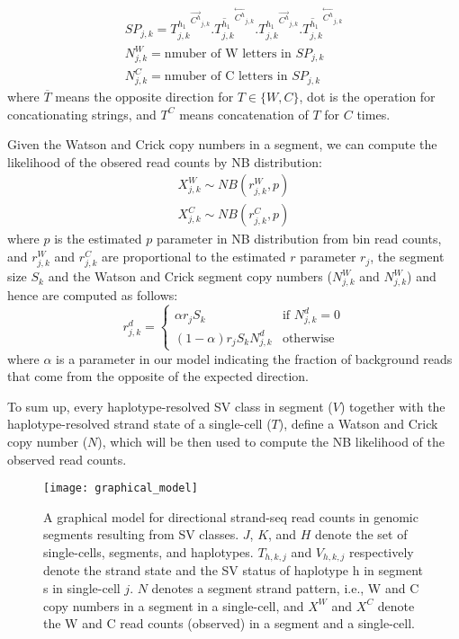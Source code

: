 \documentclass[12pt]{article}
\renewcommand{\j}{j} %
\newcommand{\CN}{C} %
\newcommand{\X}{X} %
\renewcommand{\k}{k} %
\newcommand{\h}{h} %
\newcommand{\T}{T} %
\newcommand{\V}{V} %
\newcommand{\N}{N} %
\begin{document}
\begin{align}
	SP_{\j,\k} = {\T_{\j, \k}^{\h_1}}^{\stackrel{\rightarrow}{\CN^{\h}}_{\j,\k}}.
				  {\overline{\T_{\j, \k}^{\h_1}}}^{\stackrel{\leftarrow}{\CN^{\h}}_{\j,\k}}.
				  {\T_{\j, \k}^{\h_1}}^{\stackrel{\rightarrow}{\CN^{\h}}_{\j,\k}}.
				  {\overline{\T_{\j, \k}^{\h_1}}}^{\stackrel{\leftarrow}{\CN^{\h}}_{\j,\k}}\nonumber\\
	\N_{\j, \k}^W = \text{nmuber of W letters in } SP_{\j,\k}\nonumber\\
	\N_{\j, \k}^C = \text{nmuber of C letters in } SP_{\j,\k}\nonumber
\end{align}
where $\overline{\T}$ means the opposite direction for $\T \in \{W, C\}$, dot is the operation for concationating strings, and $\T^C$ means concatenation of $\T$ for $C$ times.

Given the Watson and Crick copy numbers in a segment, we can compute the likelihood of the obsered read counts by NB distribution:
\begin{align}
	\X_{\j,\k}^W \sim NB(r_{\j,\k}^W, p)\nonumber\\
	\X_{\j,\k}^C \sim NB(r_{\j,\k}^C, p)\nonumber
\end{align}
where $p$ is the estimated $p$ parameter in NB distribution from bin read counts, and $r_{\j,\k}^W$ and $r_{\j,\k}^C$ are proportional to the estimated $r$ parameter $r_\j$, the segment size $S_\k$ and the Watson and Crick segment copy numbers ($\N_{\j, \k}^W$ and $\N_{\j, \k}^W$) and hence are computed as follows:
\[
r_{\j,\k}^d = 
\begin{cases}
\alpha r_\j S_\k &\text{if } \N_{\j, \k}^d = 0 \\ 
(1- \alpha) r_\j S_\k \N_{\j, \k}^d &\text{otherwise}
\end{cases}
\]
where $\alpha$ is a parameter in our model indicating the fraction of background reads that come from the opposite of the expected direction.

To sum up, every haplotype-resolved SV class in segment ($\V$) together with the haplotype-resolved strand state of a single-cell ($\T$), define a Watson and Crick copy number ($\N$), which will be then used to compute the NB likelihood of the observed read counts.


\begin{figure}
	\begin{center}
		\texttt{[image: graphical\_model]}
	\end{center}
\caption{A graphical model for directional strand-seq read counts in genomic segments resulting from SV classes. $J$, $K$, and $H$ denote the set of single-cells, segments, and haplotypes. $\T_{\h,\k,\j}$ and $\V_{\h,\k,\j}$ respectively denote the strand state and the SV status of haplotype h in segment s in single-cell $\j$. $\N$ denotes a segment strand pattern, i.e., W and C copy numbers in a segment in a single-cell, and $\X^W$ and $\X^C$ denote the W and C read counts (observed) in a segment and a single-cell.}
\end{figure}
\end{document}
